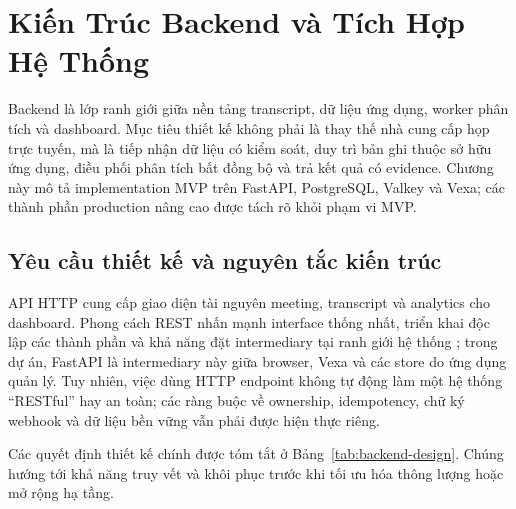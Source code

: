 \chapter{Kiến Trúc Backend và Tích Hợp Hệ Thống}
\label{chap:backend}

Backend là lớp ranh giới giữa nền tảng transcript, dữ liệu ứng dụng, worker phân tích và dashboard. Mục tiêu thiết kế không phải là thay thế nhà cung cấp họp trực tuyến, mà là tiếp nhận dữ liệu có kiểm soát, duy trì bản ghi thuộc sở hữu ứng dụng, điều phối phân tích bất đồng bộ và trả kết quả có evidence. Chương này mô tả implementation MVP trên FastAPI, PostgreSQL, Valkey và Vexa; các thành phần production nâng cao được tách rõ khỏi phạm vi MVP.

\section{Yêu cầu thiết kế và nguyên tắc kiến trúc}
API HTTP cung cấp giao diện tài nguyên meeting, transcript và analytics cho dashboard. Phong cách REST nhấn mạnh interface thống nhất, triển khai độc lập các thành phần và khả năng đặt intermediary tại ranh giới hệ thống \cite{fielding2000}; trong dự án, FastAPI là intermediary này giữa browser, Vexa và các store do ứng dụng quản lý. Tuy nhiên, việc dùng HTTP endpoint không tự động làm một hệ thống ``RESTful'' hay an toàn; các ràng buộc về ownership, idempotency, chữ ký webhook và dữ liệu bền vững vẫn phải được hiện thực riêng.

Các quyết định thiết kế chính được tóm tắt ở Bảng~\ref{tab:backend-design}. Chúng hướng tới khả năng truy vết và khôi phục trước khi tối ưu hóa thông lượng hoặc mở rộng hạ tầng.

